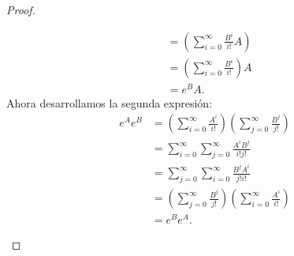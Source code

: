 \documentclass{article}
\theoremstyle{definition}
\theoremstyle{remark}
\begin{document}
\begin{proof}
\begin{enumerate}
\begin{align*}
        &= \left(\sum_{i = 0}^{\infty} \frac{B^i}{i!} A\right)\\
        &= \left(\sum_{i = 0}^{\infty} \frac{B^i}{i!}\right) A\\
        &= e^B A.
      \end{align*}
      Ahora desarrollamos la segunda expresi\'on:
      \begin{align*}
        e^A e^B &= \left(\sum_{i = 0}^{\infty} \frac{A^i}{i!}\right)\left(\sum_{j = 0}^{\infty} \frac{B^j}{j!}\right)\\
        &= \sum_{i = 0}^{\infty} \sum_{j = 0}^{\infty} \frac{A^i B^j}{i! j!}\\
        &= \sum_{j = 0}^{\infty} \sum_{i = 0}^{\infty} \frac{B^j A^i}{j! i!}\\
        &= \left(\sum_{j = 0}^{\infty} \frac{B^j}{j!}\right)\left(\sum_{i = 0}^{\infty} \frac{A^i}{i!}\right)\\
        &= e^B e^A.
      \end{align*}
  \end{enumerate}
\end{proof}
\end{document}
